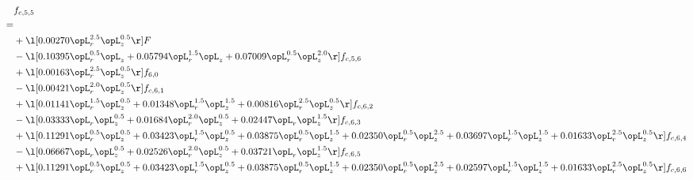 \begin{alignat}{2} 
\label{eq:f_55_2} 
& f_{c,5,5} \nonumber \\ 
 = \\ 
& + \l[  0.00270 \opL_r^{2.5} \opL_z^{0.5}  \r] F \nonumber \\ 
& - \l[  0.10395 \opL_r^{0.5} \opL_z +  0.05794 \opL_r^{1.5} \opL_z +  0.07009 \opL_r^{0.5} \opL_z^{2.0}  \r] f_{c,5,6} \nonumber \\ 
& + \l[  0.00163 \opL_r^{2.5} \opL_z^{0.5}  \r] f_{6,0} \nonumber \\ 
& - \l[  0.00421 \opL_r^{2.0} \opL_z^{0.5}  \r] f_{c,6,1} \nonumber \\ 
& + \l[  0.01141 \opL_r^{1.5} \opL_z^{0.5} +  0.01348 \opL_r^{1.5} \opL_z^{1.5} +  0.00816 \opL_r^{2.5} \opL_z^{0.5}  \r] f_{c,6,2} \nonumber \\ 
& - \l[  0.03333 \opL_r \opL_z^{0.5} +  0.01684 \opL_r^{2.0} \opL_z^{0.5} +  0.02447 \opL_r \opL_z^{1.5}  \r] f_{c,6,3} \nonumber \\ 
& + \l[  0.11291 \opL_r^{0.5} \opL_z^{0.5} +  0.03423 \opL_r^{1.5} \opL_z^{0.5} +  0.03875 \opL_r^{0.5} \opL_z^{1.5} +  0.02350 \opL_r^{0.5} \opL_z^{2.5} +  0.03697 \opL_r^{1.5} \opL_z^{1.5} +  0.01633 \opL_r^{2.5} \opL_z^{0.5}  \r] f_{c,6,4} \nonumber \\ 
& - \l[  0.06667 \opL_r \opL_z^{0.5} +  0.02526 \opL_r^{2.0} \opL_z^{0.5} +  0.03721 \opL_r \opL_z^{1.5}  \r] f_{c,6,5} \nonumber \\ 
& + \l[  0.11291 \opL_r^{0.5} \opL_z^{0.5} +  0.03423 \opL_r^{1.5} \opL_z^{0.5} +  0.03875 \opL_r^{0.5} \opL_z^{1.5} +  0.02350 \opL_r^{0.5} \opL_z^{2.5} +  0.02597 \opL_r^{1.5} \opL_z^{1.5} +  0.01633 \opL_r^{2.5} \opL_z^{0.5}  \r] f_{c,6,6} \nonumber \\ 
\end{alignat} 


